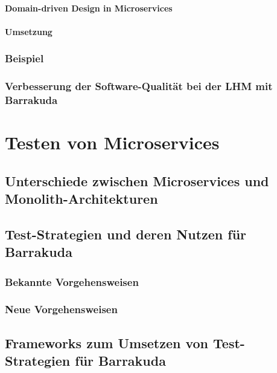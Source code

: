 \documentclass[12pt,a4paper,bibliography=totocnumbered,listof=totocnumbered]{scrartcl}
\begin{document}
\paragraph{Domain-driven Design in Microservices}

\paragraph{Umsetzung}

\subsubsection{Beispiel}

\subsubsection{Verbesserung der Software-Qualität bei der LHM mit Barrakuda}


\section{Testen von Microservices}

\subsection{Unterschiede zwischen Microservices und Monolith-Architekturen}

\subsection{Test-Strategien und deren Nutzen für Barrakuda}

\subsubsection{Bekannte Vorgehensweisen}

\subsubsection{Neue Vorgehensweisen}

\subsection{Frameworks zum Umsetzen von Test-Strategien für Barrakuda}
\end{document}
